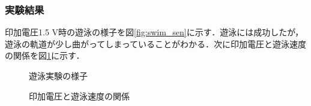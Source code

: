 \subsubsection{実験結果}
印加電圧1.5 V時の遊泳の様子を図\ref{fig:swim_sen}に示す．遊泳には成功したが，遊泳の軌道が少し曲がってしまっていることがわかる．次に印加電圧と遊泳速度の関係を図\ref{fig:speed}に示す．
\begin{figure}[htbp]
    \centering
    \begin{minipage}[b]{0.47\linewidth}
        \centering
        \caption{遊泳実験の様子\cite{kyu}}
        \label{fig:swim_sen}  
    \end{minipage}
    \hspace{0.05\linewidth}
    \begin{minipage}[b]{0.37\linewidth}
        \centering
        \caption{印加電圧と遊泳速度の関係\cite{kyu}}
        \label{fig:speed}  
    \end{minipage} 
\end{figure}
